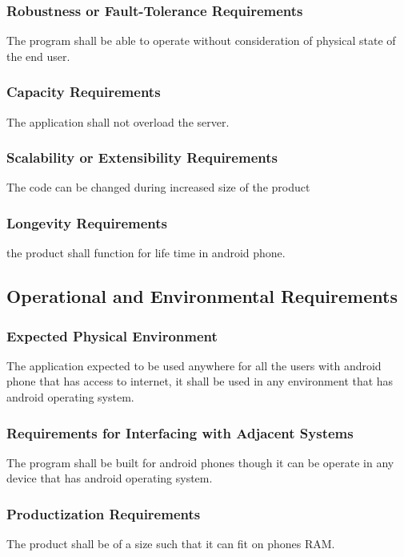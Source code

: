 \documentclass[12pt, titlepage]{article}
\begin{document}
\subsubsection{Robustness or Fault-Tolerance Requirements}
The program shall be able to operate without consideration of physical state of the end user.

\subsubsection{Capacity Requirements}
The application shall not overload the server.

\subsubsection{Scalability or Extensibility Requirements}
The code can be changed during increased size of the product

\subsubsection{Longevity Requirements}
the product shall function for life time in android phone.

\subsection{Operational and Environmental Requirements}

\subsubsection{Expected Physical Environment}
The application expected to be used anywhere for all the users with android phone that has access to internet, it shall be used in any environment that has android operating system.

\subsubsection{Requirements for Interfacing with Adjacent Systems}
The program shall be built for android phones though it can be operate in any device that has android operating system.

\subsubsection{Productization Requirements}
The product shall be of a size such that it can fit on phones RAM.
\end{document}
